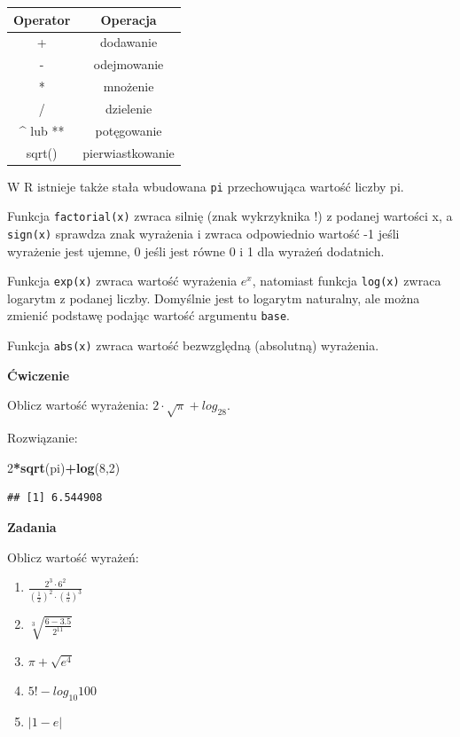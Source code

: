 \documentclass[]{book}
\newenvironment{Shaded}{\begin{snugshade}}{\end{snugshade}}
\newcommand{\KeywordTok}[1]{\textcolor[rgb]{0.13,0.29,0.53}{\textbf{#1}}}
\newcommand{\DecValTok}[1]{\textcolor[rgb]{0.00,0.00,0.81}{#1}}
\newcommand{\OperatorTok}[1]{\textcolor[rgb]{0.81,0.36,0.00}{\textbf{#1}}}
\newcommand{\NormalTok}[1]{#1}
\providecommand{\tightlist}{%
  \setlength{\itemsep}{0pt}\setlength{\parskip}{0pt}}
\begin{document}
\begin{longtable}[]{@{}cc@{}}
\toprule
Operator & Operacja\tabularnewline
\midrule
\endhead
+ & dodawanie\tabularnewline
- & odejmowanie\tabularnewline
* & mnożenie\tabularnewline
/ & dzielenie\tabularnewline
\^{} lub ** & potęgowanie\tabularnewline
sqrt() & pierwiastkowanie\tabularnewline
\bottomrule
\end{longtable}

W R istnieje także stała wbudowana \texttt{pi} przechowująca wartość
liczby pi.

Funkcja \texttt{factorial(x)} zwraca silnię (znak wykrzyknika !) z
podanej wartości x, a \texttt{sign(x)} sprawdza znak wyrażenia i zwraca
odpowiednio wartość -1 jeśli wyrażenie jest ujemne, 0 jeśli jest równe 0
i 1 dla wyrażeń dodatnich.

Funkcja \texttt{exp(x)} zwraca wartość wyrażenia \(e^x\), natomiast
funkcja \texttt{log(x)} zwraca logarytm z podanej liczby. Domyślnie jest
to logarytm naturalny, ale można zmienić podstawę podając wartość
argumentu \texttt{base}.

Funkcja \texttt{abs(x)} zwraca wartość bezwzględną (absolutną)
wyrażenia.

\textbf{Ćwiczenie}

Oblicz wartość wyrażenia: \(2\cdot \sqrt{\pi} + log_28\).

Rozwiązanie:

\begin{Shaded}
\begin{Highlighting}[]
\DecValTok{2}\OperatorTok{*}\KeywordTok{sqrt}\NormalTok{(pi)}\OperatorTok{+}\KeywordTok{log}\NormalTok{(}\DecValTok{8}\NormalTok{,}\DecValTok{2}\NormalTok{)}
\end{Highlighting}
\end{Shaded}

\begin{verbatim}
## [1] 6.544908
\end{verbatim}

\textbf{Zadania}

Oblicz wartość wyrażeń:

\begin{enumerate}
\def\labelenumi{\arabic{enumi}.}
\tightlist
\item
  \(\frac{2^3\cdot6^2}{(\frac{1}{2})^2\cdot(\frac{4}{5})^3}\)
\item
  \(\sqrt[3]{\frac{6-3.5}{2^{11}}}\)
\item
  \(\pi+\sqrt{e^4}\)
\item
  \(5! - log_{10}100\)
\item
  \(|1-e|\)
\end{enumerate}
\end{document}
